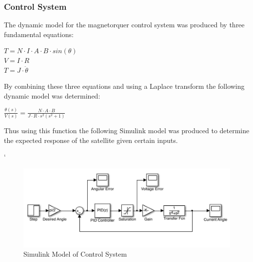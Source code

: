 \subsubsection{ Control System}
The dynamic model for the magnetorquer control system was produced by three fundamental equations:
\begin{center}
$T = N \cdot I \cdot A \cdot B \cdot sin(\theta)$ \vspace{2mm} \\
$V = I \cdot R$\vspace{2mm}\\
$T = J \cdot \ddot{\theta}$\\
\end{center}
By combining these three equations and using a Laplace transform the following dynamic model was determined:
\begin{center}
$\frac{\theta(s)}{V(s)} = \frac{N \cdot A \cdot B}{J \cdot R \cdot s^2 (s^2 + 1)}$
\end{center}
Thus using this function the following Simulink model was produced to determine the expected response of the satellite given certain inputs.

\vspace{-6mm}
\begin{center}`
\begin{figure}[H]
\caption{Simulink Model of Control System}
\vspace{-4mm}
\centering
\includegraphics[scale = 0.8]{Simulink_ADCS_Model.png}
\end{figure}
\end{center}
\vspace{-5mm}
